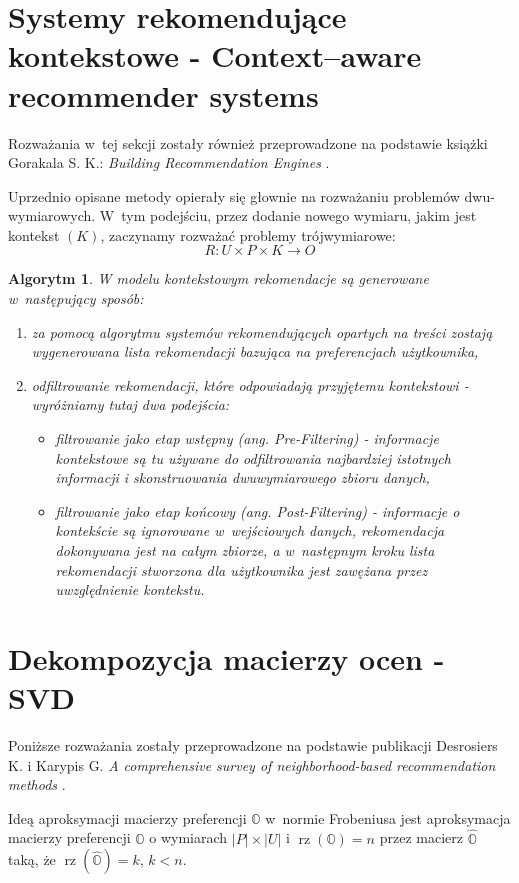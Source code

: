 \documentclass[12pt,a4paper]{report}
\newtheorem{algorytm}[df]{Algorytm}
\newcommand{\setUzytkownicy}{\mathit{U}}
\newcommand{\setPrzedmioty}{\mathit{P}}
\newcommand{\setOceny}{\mathit{O}}
\newcommand{\setKontekst}{\mathit{K}}
\newcommand{\rz}[1]{\operatorname{rz}\left({#1} \right)}
\begin{document}
\section{Systemy rekomendujące kontekstowe - Context–aware recommender systems}
Rozważania w~tej sekcji zostały również przeprowadzone na podstawie książki Gorakala S. K.: \textit{Building Recommendation Engines} {\citep[Sec 3]{bre}}.
\bigskip

Uprzednio opisane metody opierały się głownie na rozważaniu problemów dwu-wymiarowych. W~tym podejściu, przez dodanie nowego wymiaru, jakim jest kontekst $(K)$, zaczynamy rozważać problemy trójwymiarowe:
$$
R: \setUzytkownicy \times \setPrzedmioty \times \setKontekst  \rightarrow \setOceny
$$

\begin{algorytm}
W modelu kontekstowym rekomendacje są generowane w~następujący sposób:
\begin{enumerate}
\item za pomocą algorytmu systemów rekomendujących opartych na treści zostają wygenerowana lista rekomendacji bazująca na  preferencjach użytkownika,
\item odfiltrowanie rekomendacji, które odpowiadają przyjętemu kontekstowi - 
wyróżniamy tutaj dwa podejścia:
\begin{itemize}
\item filtrowanie jako etap wstępny (ang. Pre-Filtering) - informacje kontekstowe są tu używane do odfiltrowania najbardziej istotnych informacji i skonstruowania dwuwymiarowego zbioru danych,
\item filtrowanie jako etap końcowy (ang. Post-Filtering) - informacje o kontekście są ignorowane w~wejściowych danych, rekomendacja dokonywana jest na całym zbiorze, a w~następnym kroku lista rekomendacji stworzona dla użytkownika jest zawężana przez uwzględnienie kontekstu.
\end{itemize}
\end{enumerate}
\end{algorytm}

\section{Dekompozycja macierzy ocen - SVD}
Poniższe rozważania zostały przeprowadzone na podstawie publikacji Desrosiers K. i Karypis G. \textit{A comprehensive survey of neighborhood-based recommendation methods} {\citep[Sec 4.1.1]{acsonbrs}}.

Ideą aproksymacji macierzy preferencji $\mathbb{O}$ w~normie Frobeniusa jest aproksymacja macierzy preferencji $\mathbb{O}$ o wymiarach $|\mathit{P}| \times |\mathit{U}|$ i $\rz{\mathbb{O}} = n$ przez macierz $\widehat{\mathbb{O}}$ taką, że $\rz{\widehat{\mathbb{O}}} = k$, $k<n$. 
\end{document}
